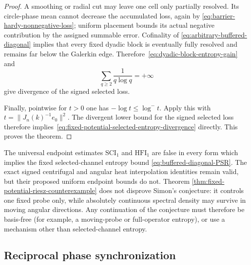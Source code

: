 \begin{proof}
A smoothing or radial cut may leave one cell only partially resolved.  Its
circle-phase mean cannot decrease the accumulated loss, again by
\eqref{eq:barrier-hardy-nonnegative-loss}; uniform placement bounds its actual
negative contribution by the assigned summable error.  Cofinality of
\eqref{eq:arbitrary-buffered-diagonal} implies that every fixed dyadic block
is eventually fully resolved and remains far below the Galerkin edge.
Therefore~\eqref{eq:dyadic-block-entropy-gain} and
\begin{equation}
 \sum_{q\geq2}\frac1{q\log q}=+\infty
\end{equation}
give divergence of the signed selected loss.

Finally, pointwise for $t>0$ one has $-\log t\leq\log^-t$.  Apply this with
$t=\|J_n(k)^{-1}e_0\|^2$.  The divergent lower bound for the signed selected
loss therefore implies~\eqref{eq:fixed-potential-selected-entropy-divergence}
directly.  This proves the theorem.
\end{proof}

\begin{corollary}
\label{cor:fixed-potential-route-closed}
The universal endpoint estimates $\mathrm{SCI}_1$ and $\mathrm{HFI}_1$ are
false in every form which implies the fixed selected-channel entropy bound
\eqref{eq:buffered-diagonal-PSR}.  The exact signed centrifugal and angular
heat interpolation identities remain valid, but their proposed uniform
endpoint bounds do not.  Theorem
\ref{thm:fixed-potential-riesz-counterexample} does not disprove Simon's
conjecture: it controls one fixed probe only, while absolutely continuous
spectral density may survive in moving angular directions.  Any continuation
of the conjecture must therefore be basis-free (for example, a moving-probe
or full-operator entropy), or use a mechanism other than selected-channel
entropy.
\end{corollary}

\subsection{Reciprocal phase synchronization}

